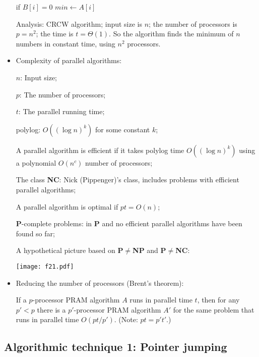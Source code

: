 \documentclass{article}
\begin{document}
\begin{itemize}
\qquad\qquad if $B[i]=0$ $min\leftarrow A[i]$

Analysis: CRCW algorithm; input size is $n$; the number of processors
is $p=n^2$; the time is $t=\Theta(1)$. So the algorithm finds the
minimum of $n$ numbers in constant time, using $n^2$ processors.

\item Complexity of parallel algorithms: 

$n$: Input size;

$p$: The number of processors;

$t$: The parallel running time;

polylog: $O((\log n)^k)$ for some constant $k$;

A parallel algorithm is efficient if it takes polylog time
$O((\log n)^k)$ using a polynomial $O(n^c)$ number of processors;

The class {\bf NC}: Nick (Pippenger)'s class, includes problems
with efficient parallel algorithms;

A parallel algorithm is optimal if $pt=O(n)$;

{\bf P}-complete problems: in {\bf P} and no efficient parallel algorithms 
have been found so far; 

A hypothetical picture based on {\bf P}$\not=${\bf NP} and
{\bf P}$\not=${\bf NC}:

\vskip 0.25cm
\begin{center}
\texttt{[image: f21.pdf]}
\end{center}

\item Reducing the number of processors (Brent's theorem):

If a $p$-processor PRAM algorithm $A$ runs in parallel time
$t$, then for any $p'<p$ there is a $p'$-processor PRAM 
algorithm $A'$ for the same problem that runs in parallel
time $O(pt/p')$. (Note: $pt=p't'$.)

\end{itemize}

\subsection{Algorithmic technique 1: Pointer jumping}
\end{document}
